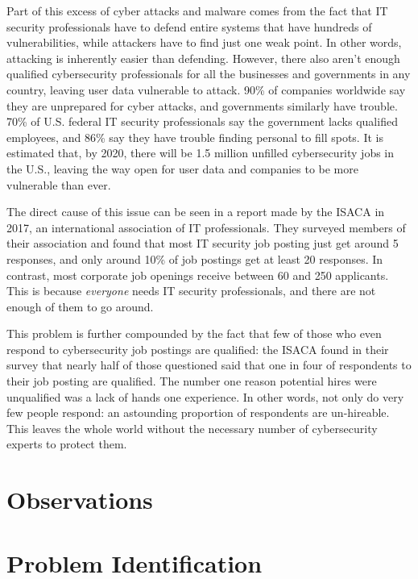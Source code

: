 \documentclass[openright]{report}
\begin{document}
\par Part of this excess of cyber attacks and malware comes from the fact that IT security professionals have to defend entire systems that have hundreds of vulnerabilities, while attackers have to find just one weak point. In other words, attacking is inherently easier than defending. However, there also aren't enough qualified cybersecurity professionals for all the businesses and governments in any country, leaving user data vulnerable to attack. 90\% of companies worldwide say they are unprepared for cyber attacks, and governments similarly have trouble. 70\% of U.S. federal IT security professionals say the government lacks qualified employees, and 86\% say they have trouble finding personal to fill spots\cite{fed_cs_jobs}. It is estimated that, by 2020, there will be 1.5 million unfilled cybersecurity jobs in the U.S., leaving the way open for user data and companies to be more vulnerable than ever\cite{why_no_cyber_classes}.

\par The direct cause of this issue can be seen in a report made by the ISACA in 2017, an international association of IT professionals. They surveyed members of their association and found that most IT security job posting just get around 5 responses, and only around 10\% of job postings get at least 20 responses. In contrast, most corporate job openings receive between 60 and 250 applicants\cite{job_survey}. This is because \textit{everyone} needs IT security professionals, and there are not enough of them to go around.

\par This problem is further compounded by the fact that few of those who even respond to cybersecurity job postings are qualified: the ISACA found in their survey that nearly half of those questioned said that one in four of respondents to their job posting are qualified. The number one reason potential hires were unqualified was a lack of hands one experience\cite{job_survey}. In other words, not only do very few people respond: an astounding proportion of respondents are un-hireable. This leaves the whole world without the necessary number of cybersecurity experts to protect them.

\section{Observations}

\section{Problem Identification}
\end{document}
